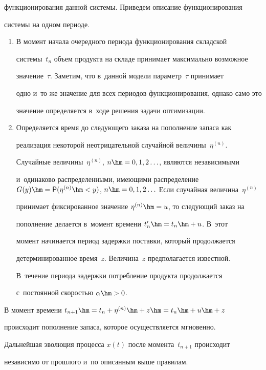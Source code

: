 функционирования данной системы. Приведем описание функционирования 

системы на одном периоде.

  \begin{enumerate}[1.]

\item В момент начала очередного периода функционирования складской 

системы~$t_n$ объем продукта на складе принимает максимально возможное 

значение~$\tau$. Заметим, что в~данной модели параметр~$\tau$ принимает 

одно и~то же значение для всех периодов функционирования, однако само это 

значение определяется в~ходе решения задачи оптимизации.

\item Определяется время до следующего заказа на пополнение запаса как 

реализация некоторой неотрицательной случайной величины~$\eta^{(n)}$. 

Случайные величины~$\eta^{(n)}$, $n\hm=0,1,2\ldots$, являются независимыми 

и~одинаково распределенными, имеющими распределение $G(y)\hm= {{\sf P}}

(\eta^{(n)}\hm<y)$, $n\hm=0,1,2\ldots$ Если случайная величина~$\eta^{(n)}$ 

принимает фиксированное значение $\eta^{(n)}\hm=u$, то следующий заказ на 

пополнение делается в~момент времени $t_n^\prime\hm= t_n\hm+u$. В~этот 

момент начинается период задержки поставки, который продолжается 

детерминированное время~$z$. Величина~$z$ предполагается известной. 

В~течение периода задержки потребление продукта продолжается 

с~постоянной скоростью $\alpha\hm>0$.

\end{enumerate}



  В момент времени $t_{n+1}\hm= t_n+\eta^{(n)}\hm+z\hm= t_n\hm+u\hm+z$ 

происходит пополнение запаса, которое осуществляется мгновенно. 

Дальнейшая эволюция процесса $x(t)$ после момента~$t_{n+1}$ происходит 

независимо от прошлого и~по описанным выше правилам.

